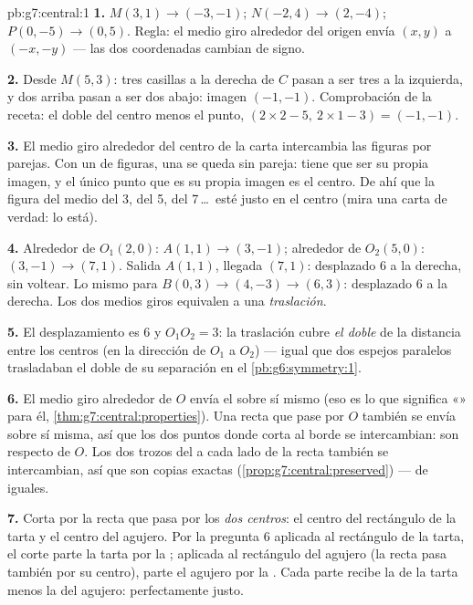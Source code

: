 \begin{solution}{pb:g7:central:1}
\textbf{1.} $M(3, 1) \to (-3, -1)$; $N(-2, 4) \to (2, -4)$;
$P(0, -5) \to (0, 5)$. Regla: el medio giro alrededor del origen
envía $(x, y)$ a $(-x, -y)$ --- las dos coordenadas cambian de signo.

\textbf{2.} Desde $M(5, 3)$: tres casillas a la derecha de $C$ pasan a ser
tres a la izquierda, y dos arriba pasan a ser dos abajo: imagen
$(-1, -1)$. Comprobación de la receta: el doble del centro menos el punto,
$(2 \times 2 - 5,\ 2 \times 1 - 3) = (-1, -1)$.

\textbf{3.} El medio giro alrededor del centro de la carta intercambia las figuras
por parejas. Con un  de figuras, una se queda sin pareja: tiene
que ser su propia imagen, y el único punto que es su propia imagen
es el centro. De ahí que la figura del medio del 3, del 5, del
7\,\dots\ esté justo en el centro (mira una carta de verdad: lo está).

\textbf{4.} Alrededor de $O_1(2,0)$: $A(1,1) \to (3,-1)$; alrededor de
$O_2(5,0)$: $(3,-1) \to (7,1)$. Salida $A(1,1)$, llegada
$(7,1)$: desplazado $6$ a la derecha, sin voltear. Lo mismo para
$B(0,3) \to (4,-3) \to (6,3)$: desplazado $6$ a la derecha. Los dos
medios giros equivalen a una \emph{traslación}.

\textbf{5.} El desplazamiento es $6$ y $O_1 O_2 = 3$: la traslación
cubre \emph{el doble} de la distancia entre los centros (en la
dirección de $O_1$ a $O_2$) --- igual que dos espejos paralelos
trasladaban el doble de su separación en el \cref{pb:g6:symmetry:1}.

\textbf{6.} El medio giro alrededor de $O$ envía el  sobre
sí mismo (eso es lo que significa «» para él,
\cref{thm:g7:central:properties}). Una recta que pase por $O$ también se
envía sobre sí misma, así que los dos puntos donde corta al
borde se intercambian: son  respecto de $O$. Los
dos trozos del  a cada lado de la recta también se intercambian,
así que son copias exactas (\cref{prop:g7:central:preserved})
--- de  iguales.

\textbf{7.} Corta por la recta que pasa por los \emph{dos centros}:
el centro del rectángulo de la tarta y el centro del agujero.
Por la pregunta 6 aplicada al rectángulo de la tarta, el corte parte la
tarta por la ; aplicada al rectángulo del agujero (la recta pasa también por su
centro), parte el agujero por la . Cada parte recibe la  de la tarta
menos la  del agujero: perfectamente justo.


\end{solution}
